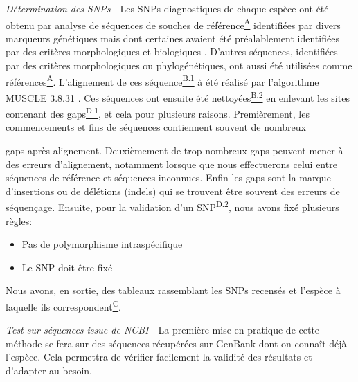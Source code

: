 \textit{Détermination des SNPs} - Les SNPs diagnostiques de chaque espèce ont été obtenu par analyse de séquences de souches de référence\hyperref[ann:annexeA]{\textsuperscript{A}} identifiées par divers marqueurs génétiques \cite{Tsykun2013} mais dont certaines avaient été préalablement identifiées par des critères morphologiques et biologiques \cite{Guillaumin1991}.  D'autres séquences, identifiées par des critères morphologiques ou phylogénétiques, ont aussi été utilisées comme références\hyperref[ann:annexeA]{\textsuperscript{A}}. L'alignement de ces séquence\hyperref[ann:annexeB1] {\textsuperscript{B.1}} à été réalisé par l'algorithme MUSCLE 3.8.31 \cite{Edgar2004}. Ces séquences ont ensuite été nettoyées\hyperref[ann:annexeB2]{\textsuperscript{B.2}} en enlevant les sites contenant des gaps\hyperref[ann:annexeD1]{\textsuperscript{D.1}}, et cela pour plusieurs raisons. Premièrement, les commencements et fins de séquences contiennent souvent de nombreux



\noindent
gaps après alignement. Deuxièmement de trop nombreux gaps peuvent mener à des erreurs d'alignement, notamment lorsque que nous effectuerons celui entre séquences de référence et séquences inconnues. Enfin les gaps sont la marque d'insertions ou de délétions (indels) qui se trouvent être souvent des erreurs de séquençage. Ensuite, pour la validation d'un SNP\hyperref[ann:annexeD2]{\textsuperscript{D.2}}, nous avons fixé plusieurs règles:
\renewcommand{\labelitemi}{$\bullet$}
\begin{itemize}
    \item Pas de polymorphisme intraspécifique
    \item Le SNP doit être fixé
\end{itemize}

Nous avons, en sortie, des tableaux rassemblant les SNPs recensés et l'espèce à laquelle ils correspondent\hyperref[ann:annexeC2]{\textsuperscript{C}}.

\textit{Test sur séquences issue de NCBI} - La première mise en pratique de cette méthode se fera sur des séquences récupérées sur GenBank dont on connaît déjà l'espèce. Cela permettra de vérifier facilement la validité des résultats et d'adapter au besoin.


